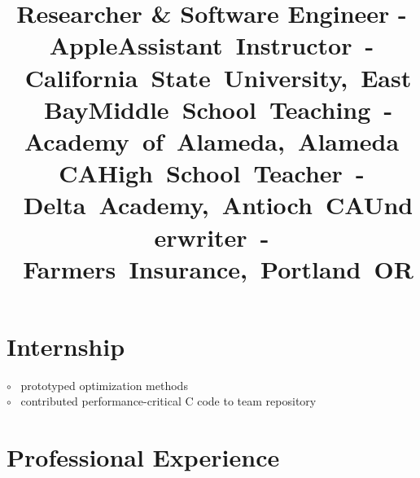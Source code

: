 \documentclass[12pt,margintitle,line]{res}
\newcommand{\CC}{C\nolinebreak\hspace{-.05em}\raisebox{.4ex}{\scriptsize\bf +}\nolinebreak\hspace{-.10em}\raisebox{.4ex}{\scriptsize\bf +} }
\def\CC{{C\nolinebreak[4]\hspace{-.05em}\raisebox{.4ex}{\scriptsize\bf ++}}}
\begin{document}
\begin{resume}
\vspace{-1.3cm}

\section{Internship}

\vspace{-0.5cm}
\title{Researcher \& Software Engineer - Apple}
\dates{}
\begin{position}
$\circ$ \ prototyped optimization methods \\
$\circ$ \ contributed performance-critical \CC \hspace{-0.02cm} code to team repository 
\end{position}



\vspace{-0.2cm}

\section{Professional Experience}

\vspace{-0.5cm}
\title{\mbox{Assistant Instructor - California State University, East Bay}}
\dates{}
\begin{position}
\end{position}


\vspace{-1.8cm}
\title{\mbox{Middle School Teaching - Academy of Alameda, Alameda CA}}
\dates{}
\begin{position}
\end{position}

\vspace{-1.8cm}
\title{\mbox{High School Teacher - Delta Academy, Antioch CA}}
\dates{}
\begin{position}
\end{position}

\vspace{-1.8cm}
\title{\mbox{Underwriter - Farmers Insurance, Portland OR}}
\dates{}
\begin{position}
\end{position}




\vspace{-1.2cm}


\end{resume}
\end{document}
